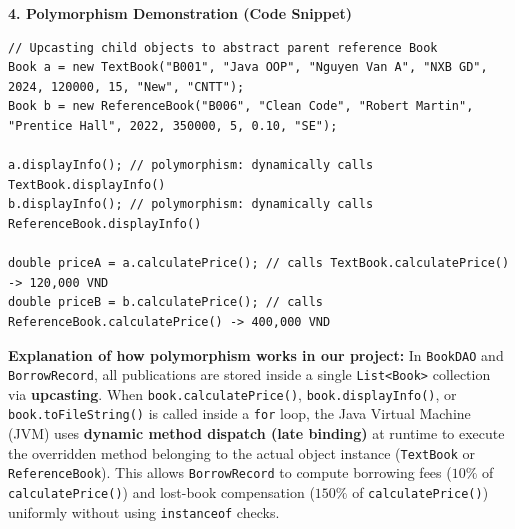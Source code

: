 \documentclass[12pt,a4paper]{article}
\begin{document}
\begin{center}
\end{center}

\textbf{4. Polymorphism Demonstration (Code Snippet)}

\begin{lstlisting}[style=javastyle]
// Upcasting child objects to abstract parent reference Book
Book a = new TextBook("B001", "Java OOP", "Nguyen Van A", "NXB GD", 2024, 120000, 15, "New", "CNTT");
Book b = new ReferenceBook("B006", "Clean Code", "Robert Martin", "Prentice Hall", 2022, 350000, 5, 0.10, "SE");

a.displayInfo(); // polymorphism: dynamically calls TextBook.displayInfo()
b.displayInfo(); // polymorphism: dynamically calls ReferenceBook.displayInfo()

double priceA = a.calculatePrice(); // calls TextBook.calculatePrice() -> 120,000 VND
double priceB = b.calculatePrice(); // calls ReferenceBook.calculatePrice() -> 400,000 VND
\end{lstlisting}

\textbf{Explanation of how polymorphism works in our project:} In \texttt{BookDAO} and \texttt{BorrowRecord}, all publications are stored inside a single \texttt{List<Book>} collection via \textbf{upcasting}. When \texttt{book.calculatePrice()}, \texttt{book.displayInfo()}, or \texttt{book.toFileString()} is called inside a \texttt{for} loop, the Java Virtual Machine (JVM) uses \textbf{dynamic method dispatch (late binding)} at runtime to execute the overridden method belonging to the actual object instance (\texttt{TextBook} or \texttt{ReferenceBook}). This allows \texttt{BorrowRecord} to compute borrowing fees ($10\%$ of \texttt{calculatePrice()}) and lost-book compensation ($150\%$ of \texttt{calculatePrice()}) uniformly without using \texttt{instanceof} checks.
\end{document}
